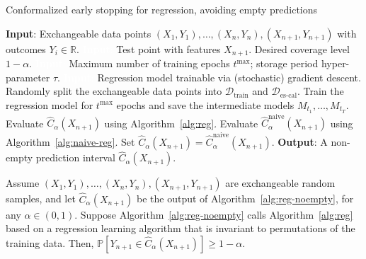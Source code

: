 \begin{algorithm}[H]
    \caption{Conformalized early stopping for regression, avoiding empty predictions}
    \label{alg:reg-noempty}
    \begin{algorithmic}[1]
        \STATE \textbf{Input}: Exchangeable data points $(X_{1},Y_{1}), \ldots, (X_{n},Y_{n}), (X_{n+1},Y_{n+1})$ with outcomes $Y_i \in \mathbb{R}$.
        \STATE \textcolor{white}{\textbf{Input}:} Test point with features $X_{n+1}$. Desired coverage level $1-\alpha$.
        \STATE \textcolor{white}{\textbf{Input}:} Maximum number of training epochs $t^{\max}$; storage period hyper-parameter $\tau$.
        \STATE \textcolor{white}{\textbf{Input}:} Regression model trainable via (stochastic) gradient descent.
        \STATE Randomly split the exchangeable data points into $\mathcal{D}_{\text{train}}$ and $\mathcal{D}_{\text{es-cal}}$.
        \STATE Train the regression model for $t^{\text{max}}$ epochs and save the intermediate models $M_{t_1} , \dots, M_{t_T}$.
        \STATE Evaluate $\hat{C}_{\alpha}(X_{n+1})$ using Algorithm~\ref{alg:reg}.
        \STATE Evaluate $\hat{C}^{\text{naive}}_{\alpha}(X_{n+1})$ using Algorithm~\ref{alg:naive-reg}. Set $\hat{C}_{\alpha}(X_{n+1}) = \hat{C}^{\text{naive}}_{\alpha}(X_{n+1})$.
        \ENDIF
        \STATE \textbf{Output}: A non-empty prediction interval $\hat{C}_{\alpha}(X_{n+1})$.
    \end{algorithmic}
\end{algorithm}

\begin{corollary}\label{thm:reg-noempty}
Assume $(X_{1},Y_{1}), \ldots, (X_{n},Y_{n}), (X_{n+1},Y_{n+1})$ are exchangeable random samples, and let $\hat{C}_{\alpha}(X_{n+1})$ be the output of Algorithm~\ref{alg:reg-noempty}, for any $\alpha \in (0,1)$. Suppose Algorithm~\ref{alg:reg-noempty} calls Algorithm~\ref{alg:reg} based on a regression learning algorithm that is invariant to permutations of the training data. Then, $\mathbb{P}[Y_{n+1} \in \hat{C}_{\alpha}(X_{n+1})] \geq 1-\alpha$.
\end{corollary}


